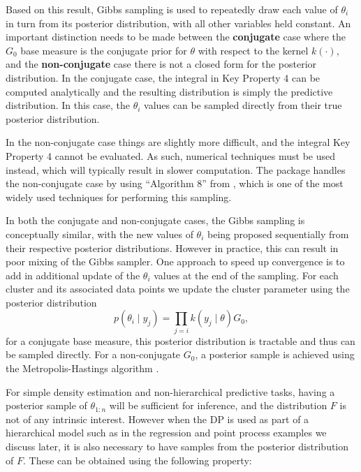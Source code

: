 \documentclass[nojss]{jss}
\begin{document}
Based on this result, Gibbs sampling is used to repeatedly draw each value of $\theta_i$ in turn from its posterior distribution, with all other variables held constant. An important distinction needs to be made between the \textbf{conjugate} case where the $G_0$ base measure is the conjugate prior for $\theta$ with respect to the kernel $k(\cdot)$, and the \textbf{non-conjugate} case there is not a closed form for the posterior distribution. In the conjugate case, the integral in Key Property 4 can be computed analytically and the resulting distribution is simply the predictive distribution. In this case, the $\theta_i$ values can be sampled directly from their true posterior distribution.

In the non-conjugate case things are slightly more difficult, and the integral Key Property 4 cannot be evaluated. As such, numerical techniques must be used instead, which will typically result in slower computation. The  package handles the non-conjugate case by using ``Algorithm 8'' from \citep{neal_markov_2000}, which is one of the most widely used techniques for performing this sampling.

In both the conjugate and non-conjugate cases, the Gibbs sampling is conceptually similar, with the new values of $\theta_i$ being proposed sequentially from their respective posterior distributions. However in practice, this can result in poor mixing of the Gibbs sampler. One approach to speed up convergence is to add in additional update of the $\theta_i$ values at the end of the sampling. For each cluster and its associated data points we update the cluster parameter using the posterior distribution
\begin{equation}
p (\theta _i \mid y_{j}) = \prod _{j=i} k(y_j \mid \theta) G_0,
\label{eq:clusterpost}
\end{equation}
for a conjugate base measure, this posterior distribution is tractable and thus can be sampled directly. For a non-conjugate $G_0$, a posterior sample is achieved using the Metropolis-Hastings algorithm \citep{hastings_monte_1970}.

For simple density estimation and non-hierarchical predictive tasks, having a posterior sample of $\theta_{1:n}$ will be sufficient for inference, and the distribution $F$ is not of any intrinsic interest. However when the DP is used as part of a hierarchical model such as in the regression and point process examples we discuss later, it is also necessary to have samples from the posterior distribution of $F$. These can be obtained using the following property:
\end{document}
